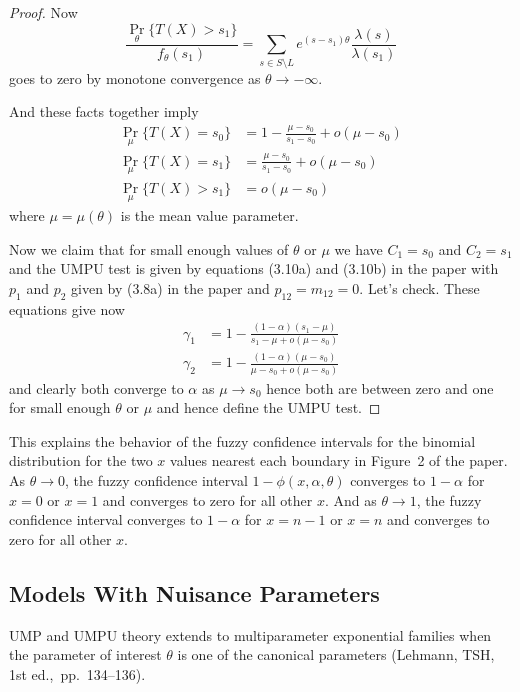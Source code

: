 \documentclass{article}
\DeclareMathOperator{\pr}{Pr}
\begin{document}
\begin{proof}
Now
$$
   \frac{\pr_\theta\{T(X) > s_1\}}{f_\theta(s_1)}
   =
   \sum_{s \in S \setminus L}
   e^{(s - s_1) \theta} \frac{\lambda(s)}{\lambda(s_1)}
$$
goes to zero by monotone convergence as $\theta \to - \infty$.

And these facts together imply
\begin{equation} \label{eq:expo-gen}
\begin{split}
   \pr_\mu\{T(X) = s_0\} & = 1 - \frac{\mu - s_0}{s_1 - s_0} + o(\mu - s_0)
   \\
   \pr_\mu\{T(X) = s_1\} & = \frac{\mu - s_0}{s_1 - s_0} + o(\mu - s_0)
   \\
   \pr_\mu\{T(X) > s_1\} & = o(\mu - s_0)
\end{split}
\end{equation}
where $\mu = \mu(\theta)$ is the mean value parameter.

Now we claim that for small enough values of $\theta$ or $\mu$
we have $C_1 = s_0$ and $C_2 = s_1$ and the UMPU test is given by
equations (3.10a) and (3.10b) in the paper with $p_1$ and $p_2$
given by (3.8a) in the paper and $p_{1 2} = m_{1 2} = 0$.  Let's check.
These equations give now
\begin{align*}
   \gamma_1
   & =
   1 - \frac{(1 - \alpha) (s_1 - \mu)}{s_1 - \mu + o(\mu - s_0)}
   \\
   \gamma_2
   & =
   1 - \frac{(1 - \alpha) (\mu - s_0)}{\mu - s_0 + o(\mu - s_0)}
\end{align*}
and clearly both converge to $\alpha$ as $\mu \to s_0$ hence both are
between zero and one for small enough $\theta$ or $\mu$ and hence
define the UMPU test.
\end{proof}

This explains the behavior of the
fuzzy confidence intervals for the binomial distribution for
the two $x$ values nearest each boundary in Figure~2 of the paper.
As $\theta \to 0$, the fuzzy confidence interval $1 - \phi(x, \alpha, \theta)$
converges to $1 - \alpha$ for $x = 0$ or $x = 1$ and converges to zero
for all other $x$.
And as $\theta \to 1$, the fuzzy confidence interval
converges to $1 - \alpha$ for $x = n - 1$ or $x = n$ and converges to zero
for all other $x$.

\subsection{Models With Nuisance Parameters}

UMP and UMPU theory extends to multiparameter exponential families
when the parameter of interest $\theta$ is one of the canonical parameters
(Lehmann, TSH, 1st ed.,\ pp.\ 134--136).
\end{document}
